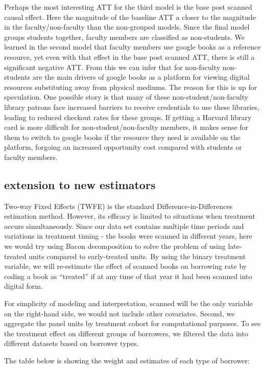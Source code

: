 \documentclass{article}
\begin{document}
Perhaps the most interesting ATT for the third model is the base post scanned causal effect. Here the magnitude of the baseline ATT a closer to the magnitude in the faculty/non-faculty than the non-grouped models. Since the final model groups students together, faculty members are classified as non-students. We learned in the second model that faculty members use google books as a reference resource, yet even with that effect in the base post scanned ATT, there is still a significant negative ATT. From this we can infer that for non-faculty non-students are the main drivers of google books as a platform for viewing digital resources substituting away from physical mediums. The reason for this is up for speculation. One possible story is that many of these non-student/non-faculty library patrons face increased barriers to receive credentials to use these libraries, leading to reduced checkout rates for these groups. If getting a Harvard library card is more difficult for non-student/non-faculty members, it makes sense for them to switch to google books if the resource they need is available on the platform, forgoing an increased opportunity cost compared with students or faculty members.


\subsection{extension to new estimators}
Two-way Fixed Effects (TWFE) is the standard Difference-in-Differences estimation method. However, its efficacy is limited to situations when treatment occurs simultaneously. Since our data set contains multiple time periods and variations in treatment timing - the books were scanned in different years, here we would try using Bacon decomposition to solve the problem of using late-treated units compared to early-treated units. By using the binary treatment variable, we will re-estimate the effect of scanned books on borrowing rate by coding a book as “treated” if at any time of that year it had been scanned into digital form.

For simplicity of modeling and interpretation, scanned will be the only variable on the right-hand side, we would not include other covariates. Second, we aggregate the panel units by treatment cohort for computational purposes. To see the treatment effect on different groups of borrowers, we filtered the data into different datasets based on borrower types.

The table below is showing the weight and estimates of each type of borrower:
\end{document}
